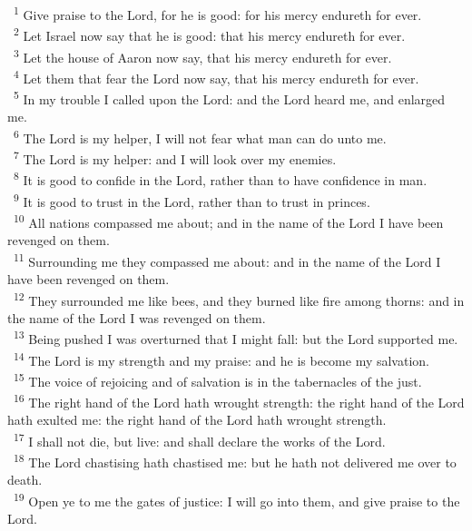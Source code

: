 \documentclass[a5paper,12pt]{article}
\begin{document}
\begin{multicols*}{2}
~\textsuperscript{1} Give praise to the Lord, for he is good: for his mercy endureth for ever.\\
~\textsuperscript{2} Let Israel now say that he is good: that his mercy endureth for ever.\\
~\textsuperscript{3} Let the house of Aaron now say, that his mercy endureth for ever.\\
~\textsuperscript{4} Let them that fear the Lord now say, that his mercy endureth for ever.\\
~\textsuperscript{5} In my trouble I called upon the Lord: and the Lord heard me, and enlarged me.\\
~\textsuperscript{6} The Lord is my helper, I will not fear what man can do unto me.\\
~\textsuperscript{7} The Lord is my helper: and I will look over my enemies.\\
~\textsuperscript{8} It is good to confide in the Lord, rather than to have confidence in man.\\
~\textsuperscript{9} It is good to trust in the Lord, rather than to trust in princes.\\
~\textsuperscript{10} All nations compassed me about; and in the name of the Lord I have been revenged on them.\\
~\textsuperscript{11} Surrounding me they compassed me about: and in the name of the Lord I have been revenged on them.\\
~\textsuperscript{12} They surrounded me like bees, and they burned like fire among thorns: and in the name of the Lord I was revenged on them.\\
~\textsuperscript{13} Being pushed I was overturned that I might fall: but the Lord supported me.\\
~\textsuperscript{14} The Lord is my strength and my praise: and he is become my salvation.\\
~\textsuperscript{15} The voice of rejoicing and of salvation is in the tabernacles of the just.\\
~\textsuperscript{16} The right hand of the Lord hath wrought strength: the right hand of the Lord hath exulted me: the right hand of the Lord hath wrought strength.\\
~\textsuperscript{17} I shall not die, but live: and shall declare the works of the Lord.\\
~\textsuperscript{18} The Lord chastising hath chastised me: but he hath not delivered me over to death.\\
~\textsuperscript{19} Open ye to me the gates of justice: I will go into them, and give praise to the Lord.\\

\end{multicols*}
\end{document}

